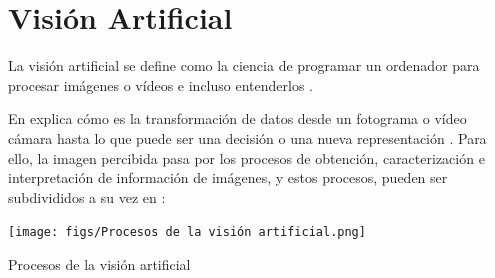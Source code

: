 \pagebreak

\section{Visión Artificial}
\label{sec:VA} 

La visión artificial se define como la ciencia de programar un ordenador para procesar imágenes o vídeos e incluso entenderlos \cite{Culjak12}. 

En \cite{Bradski08} explica cómo es la transformación de datos desde un fotograma o vídeo cámara hasta lo que puede ser una decisión o una nueva representación \cite{Alvear17}. Para ello, la imagen percibida pasa por los procesos de obtención, caracterización e interpretación de información de imágenes, y estos procesos, pueden ser subdivididos a su vez en \cite{Santillan15}:\\

\begin{table} [h!]
  \begin{center}
      \texttt{[image: figs/Procesos de la visión artificial.png]}
  \end{center}
  \caption{Procesos de la visión artificial}
  \label{cuadro:procesos_VA}
\end{table}

